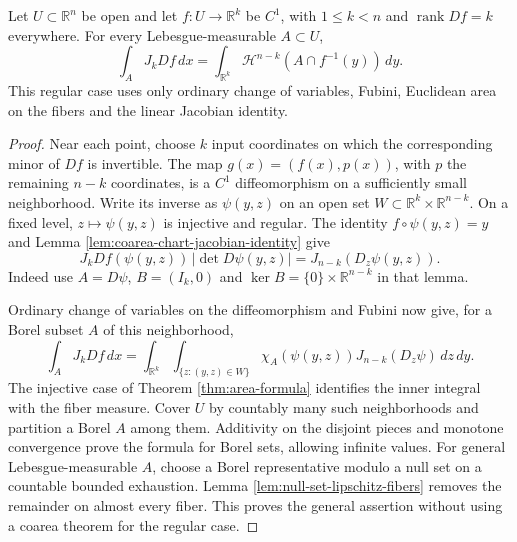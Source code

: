 \begin{proposition}\label{prop:full-rank-c1-coarea}
Let $U\subset\mathbb R^n$ be open and let $f:U\to\mathbb R^k$ be $C^1$, with $1\leq k<n$ and $\operatorname{rank}Df=k$ everywhere. For every Lebesgue-measurable $A\subset U$,
\[
 \int_AJ_kDf\,dx=\int_{\mathbb R^k}\mathcal H^{n-k}(A\cap f^{-1}(y))\,dy.
\]
This regular case uses only ordinary change of variables, Fubini, Euclidean area on the fibers and the linear Jacobian identity.
\end{proposition}
\begin{proof}
Near each point, choose $k$ input coordinates on which the corresponding minor of $Df$ is invertible. The map $g(x)=(f(x),p(x))$, with $p$ the remaining $n-k$ coordinates, is a $C^1$ diffeomorphism on a sufficiently small neighborhood. Write its inverse as $\psi(y,z)$ on an open set $W\subset\mathbb R^k\times\mathbb R^{n-k}$. On a fixed level, $z\mapsto\psi(y,z)$ is injective and regular. The identity $f\circ\psi(y,z)=y$ and Lemma \ref{lem:coarea-chart-jacobian-identity} give
\[
 J_kDf(\psi(y,z))\,|\det D\psi(y,z)|
 =J_{n-k}(D_z\psi(y,z)).
\]
Indeed use $A=D\psi$, $B=(I_k,0)$ and $\ker B=\{0\}\times\mathbb R^{n-k}$ in that lemma.

Ordinary change of variables on the diffeomorphism and Fubini now give, for a Borel subset $A$ of this neighborhood,
\[
 \int_AJ_kDf\,dx
 =\int_{\mathbb R^k}\int_{\{z:(y,z)\in W\}}
 \chi_A(\psi(y,z))J_{n-k}(D_z\psi)\,dz\,dy.
\]
The injective case of Theorem \ref{thm:area-formula} identifies the inner integral with the fiber measure. Cover $U$ by countably many such neighborhoods and partition a Borel $A$ among them. Additivity on the disjoint pieces and monotone convergence prove the formula for Borel sets, allowing infinite values. For general Lebesgue-measurable $A$, choose a Borel representative modulo a null set on a countable bounded exhaustion. Lemma \ref{lem:null-set-lipschitz-fibers} removes the remainder on almost every fiber. This proves the general assertion without using a coarea theorem for the regular case.
\end{proof}


